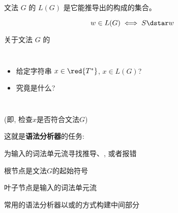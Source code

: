 \begin{frame}{}
  \begin{definition}[文法$G$生成的语言 $L(G)$]
    文法 $G$ 的 $L(G)$ 是它能推导出的构成的集合。

    \[
      w \in L(G) \iff S \dstar w
    \]
  \end{definition}
\end{frame}

\begin{frame}{}
  \begin{center}
    关于文法 $G$ 的
  \end{center}

  \vspace{0.60cm}
  \begin{columns}
      \begin{itemize}
        \setlength{\itemsep}{15pt}
        \item {}
          给定字符串 $x \in \red{T^{\ast}}$, $x \in L(G)$?
        \item {} 究竟是什么?
      \end{itemize}
  \end{columns}
\end{frame}

\begin{frame}{}
  \begin{center}

    \vspace{0.20cm}
    (即, 检查$x$是否符合文法$G$)

    \vspace{1.00cm}
    这就是{\bf 语法分析器}的任务:

    \vspace{0.30cm}
    为输入的词法单元流寻找推导、, 或者报错
  \end{center}
\end{frame}

\begin{frame}{}
  \begin{center}
    根节点是文法$G$的起始符号


    叶子节点是输入的词法单元流

    \vspace{0.50cm}
    常用的语法分析器以或的方式构建中间部分
  \end{center}
\end{frame}

